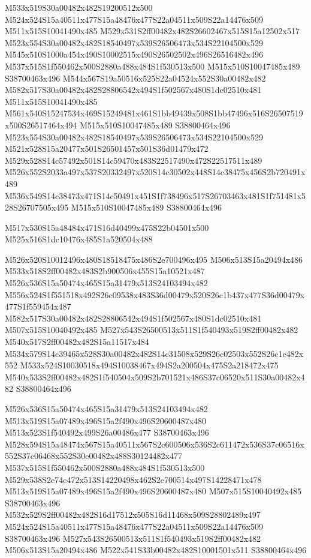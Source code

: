 \documentclass{article}
\begin{document}
\begin{multicols}{2}

M533x519S30a00482x482S19200512x500 M524x524S15a40511x477S15a48476x477S22a04511x509S22a14476x509 M511x515S10041490x485 M529x531S2ff00482x482S26602467x515S15a12502x517 M523x554S30a00482x482S18540497x539S26506473x534S22104500x529 M545x510S1000a454x490S10002515x490S26502502x496S26516482x496 M537x515S1f550462x500S2880a488x484S1f530513x500 M515x510S10047485x489 S38700463x496 M544x567S19a50516x525S22a04524x552S30a00482x482 M582x517S30a00482x482S28806542x494S1f502567x480S1dc02510x481 M511x515S10041490x485 M561x540S15247534x469S15249481x461S1bb49439x508S1bb47496x516S26507519x500S26517464x494 M515x510S10047485x489 S38800464x496 M523x554S30a00482x482S18540497x539S26506473x534S22104500x529 M521x528S15a20477x501S26501457x501S36d01479x472 M529x528S14c57492x501S14c59470x483S22517490x472S22517511x489 M526x552S2033a497x537S20332497x520S14c30502x448S14c38475x456S2b720491x489 M536x549S14c38473x471S14c50491x451S1f738496x517S26703463x481S1f751481x528S26707505x495 M515x510S10047485x489 S38800464x496

\begin{center}
M517x530S15a48484x471S16d40499x475S22b04501x500 M525x516S1dc10476x485S1a520504x488 
\end{center}


M526x520S10012496x480S18518475x486S2e700496x495 M506x513S15a20494x486 M533x518S2ff00482x483S2b900506x455S15a10521x487 M526x536S15a50474x465S15a31479x513S24103494x482 M556x524S1f551518x492S26c09538x483S36d00479x520S26c1b437x477S36d00479x477S1f559454x487 M582x517S30a00482x482S28806542x494S1f502567x480S1dc02510x481 M507x515S10040492x485 M527x543S26500513x511S1f540493x519S2ff00482x482 M540x517S2ff00482x482S15a11517x484 M534x579S14c39465x528S30a00482x482S14c31508x529S26c02503x552S26c1e482x552 M533x524S10030518x494S10038467x494S2a200504x475S2a218472x475 M540x533S2ff00482x482S1f540504x509S2b701521x486S37c06520x511S30a00482x482 S38800464x496

M526x536S15a50474x465S15a31479x513S24103494x482 M513x519S15a07489x496S15a2f490x496S20600487x480 M513x523S1f540492x499S26a00486x477 S38700463x496 M528x594S15a48474x567S15a40511x567S2c600506x536S2c611472x536S37c06516x552S37c06468x552S30e00482x488S30124482x477 M537x515S1f550462x500S2880a488x484S1f530513x500 M529x538S2e74c472x513S14220498x462S2e700514x497S14228471x478 M513x519S15a07489x496S15a2f490x496S20600487x480 M507x515S10040492x485 S38700463x496 M532x529S2ff00482x482S16d17512x505S16d11468x509S28802489x497 M524x524S15a40511x477S15a48476x477S22a04511x509S22a14476x509 S38700463x496 M527x543S26500513x511S1f540493x519S2ff00482x482 M506x513S15a20494x486 M522x541S33b00482x482S10001501x511 S38800464x496


\end{multicols}
\end{document}
